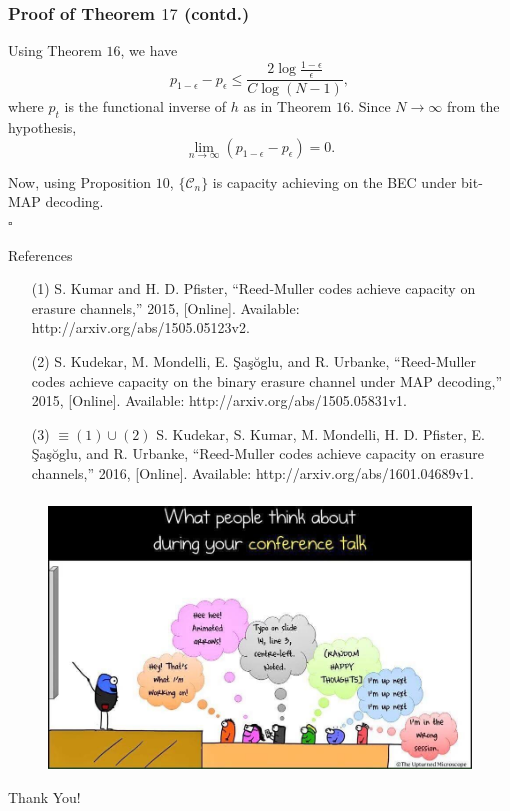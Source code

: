 \documentclass[xcolor=dvipsnames]{beamer}
\begin{document}
\begin{frame}
\frametitle{Proof of Theorem $17$ (contd.)}
Using Theorem $16$, we have $$p_{1-\epsilon} - p_\epsilon \le \frac{2 \log \frac{1-\epsilon}{\epsilon}}{C\log (N-1)},$$ where $p_t$ is the functional inverse of $h$ as in Theorem $16$. Since $N \to \infty$ from the hypothesis, $$\lim_{n \to \infty} (p_{1-\epsilon} - p_\epsilon) = 0.$$

Now, using Proposition $10$, $\{\mathcal{C}_n\}$ is capacity achieving on the BEC under bit-MAP decoding. \\$\square$
\end{frame}

\begin{frame}{References}
\begin{enumerate}
\item[(1)] S. Kumar and H. D. Pfister, “Reed-Muller codes achieve
capacity on erasure channels,” 2015, [Online]. Available:
http://arxiv.org/abs/1505.05123v2.
\item[(2)] S. Kudekar, M. Mondelli, E. \c{S}a\c{s}\u{o}glu, and R. Urbanke, “Reed-Muller codes achieve capacity on the binary erasure channel under MAP
decoding,” 2015, [Online]. Available: http://arxiv.org/abs/1505.05831v1.
\item[(3)] {\color{MidnightBlue}$\equiv (1) \cup (2)$} S. Kudekar, S. Kumar, M. Mondelli, H. D. Pfister, E. \c{S}a\c{s}\u{o}glu, and R. Urbanke, “Reed-Muller codes achieve
capacity on erasure channels,” 2016, [Online]. Available:
http://arxiv.org/abs/1601.04689v1.
\end{enumerate}
\end{frame}

\begin{frame}
\frametitle{}
\begin{figure}[!htb]
\begin{center}
\includegraphics[scale=0.35]{./figures/questions.jpg}
\end{center}
\end{figure}
\begin{block}{}
\centering
Thank You!
\end{block}
\end{frame}
\end{document}
